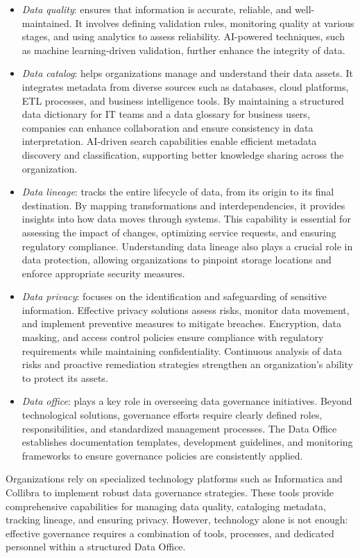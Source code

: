 \begin{itemize}
    \item \textit{Data quality}: ensures that information is accurate, reliable, and well-maintained. 
        It involves defining validation rules, monitoring quality at various stages, and using analytics to assess reliability. 
        AI-powered techniques, such as machine learning-driven validation, further enhance the integrity of data.
    \item \textit{Data catalog}: helps organizations manage and understand their data assets. 
        It integrates metadata from diverse sources such as databases, cloud platforms, ETL processes, and business intelligence tools. 
        By maintaining a structured data dictionary for IT teams and a data glossary for business users, companies can enhance collaboration and ensure consistency in data interpretation. 
        AI-driven search capabilities enable efficient metadata discovery and classification, supporting better knowledge sharing across the organization.
    \item \textit{Data lineage}: tracks the entire lifecycle of data, from its origin to its final destination. 
        By mapping transformations and interdependencies, it provides insights into how data moves through systems. 
        This capability is essential for assessing the impact of changes, optimizing service requests, and ensuring regulatory compliance. 
        Understanding data lineage also plays a crucial role in data protection, allowing organizations to pinpoint storage locations and enforce appropriate security measures.
    \item \textit{Data privacy}: focuses on the identification and safeguarding of sensitive information. 
        Effective privacy solutions assess risks, monitor data movement, and implement preventive measures to mitigate breaches. 
        Encryption, data masking, and access control policies ensure compliance with regulatory requirements while maintaining confidentiality. 
        Continuous analysis of data risks and proactive remediation strategies strengthen an organization's ability to protect its assets.
    \item \textit{Data office}: plays a key role in overseeing data governance initiatives. 
        Beyond technological solutions, governance efforts require clearly defined roles, responsibilities, and standardized management processes. 
        The Data Office establishes documentation templates, development guidelines, and monitoring frameworks to ensure governance policies are consistently applied.
\end{itemize}
\noindent Organizations rely on specialized technology platforms such as Informatica and Collibra to implement robust data governance strategies. 
These tools provide comprehensive capabilities for managing data quality, cataloging metadata, tracking lineage, and ensuring privacy. 
However, technology alone is not enough: effective governance requires a combination of tools, processes, and dedicated personnel within a structured Data Office.

